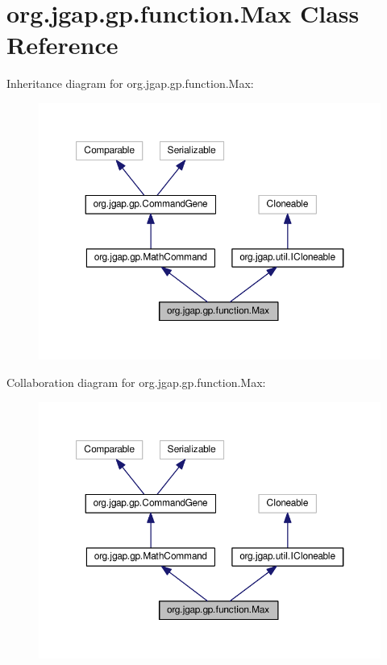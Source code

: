 \hypertarget{classorg_1_1jgap_1_1gp_1_1function_1_1_max}{\section{org.\-jgap.\-gp.\-function.\-Max Class Reference}
\label{classorg_1_1jgap_1_1gp_1_1function_1_1_max}
}


Inheritance diagram for org.\-jgap.\-gp.\-function.\-Max\-:
\nopagebreak
\begin{figure}[H]
\begin{center}
\leavevmode
\includegraphics[width=350pt]{classorg_1_1jgap_1_1gp_1_1function_1_1_max__inherit__graph}
\end{center}
\end{figure}


Collaboration diagram for org.\-jgap.\-gp.\-function.\-Max\-:
\nopagebreak
\begin{figure}[H]
\begin{center}
\leavevmode
\includegraphics[width=350pt]{classorg_1_1jgap_1_1gp_1_1function_1_1_max__coll__graph}
\end{center}
\end{figure}

